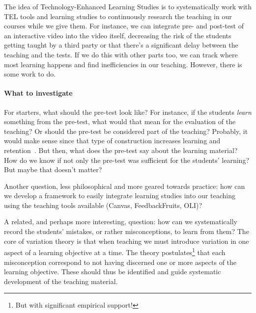 The idea of Technology-Enhanced Learning Studies is to systematically work with 
\ac{TEL} tools and learning studies to continuously research the teaching in 
our courses while we give them.
For instance, we can integrate pre- and post-test of an interactive video into 
the video itself, decreasing the risk of the students getting taught by a third 
party or that there's a significant delay between the teaching and the tests.
If we do this with other parts too, we can track where most learning happens 
and find inefficiencies in our teaching.
However, there is some work to do.


\paragraph{What to investigate}

For starters, what should the pre-test look like?
For instance, if the students \emph{learn} something from the pre-test, what 
would that mean for the evaluation of the teaching?
Or should the pre-test be considered part of the teaching?
Probably, it would make sense since that type of construction increases 
learning and retention~\autocite{Szekely1950,BransfordSchwartz1999}.
But then, what does the pre-test say about the learning material?
How do we know if not only the pre-test was sufficient for the students' 
learning?
But maybe that doesn't matter?

Another question, less philosophical and more geared towards practice: how can 
we develop a framework to easily integrate learning studies into our teaching 
using the teaching tools available (Canvas, FeedbackFruits, OLI)?

A related, and perhaps more interesting, question: how can we systematically 
record the students' mistakes, or rather misconceptions, to learn from them?
The core of variation theory is that when teaching we must introduce variation 
in one aspect of a learning objective at a time.
The theory postulates\footnote{%
  But with significant empirical support!
} that each misconception correspond to not having discerned one or more 
aspects of the learning objective.
These should thus be identified and guide systematic development of the 
teaching material.


